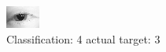 \begin{figure}[h!]
\begin{center}
\includegraphics[width=0.60\columnwidth]{figures/ID36_class_4_target_3.png}
\end{center}
\caption{ Classification: 4 actual target: 3}
\label{fig:ID36_class_4_target_3}
\end{figure}

